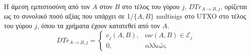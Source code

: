 {}
\begin{definition}
  Η άμεση εμπιστοσύνη από τον $A$ στον $B$ στο τέλος του γύρου $j$, $DTr_{A \rightarrow B, j}$, ορίζεται ως το συνολικό ποσό
  αξίας που υπάρχει σε 1/$\{A,B\}$ \textlatin{multisigs} στο \textlatin{UTXO} στο τέλος του γύρου $j$, όπου τα χρήματα έχουν
  κατατεθεί από τον $A$.
  \begin{equation}
    DTr_{A \rightarrow B, j} =
      \begin{cases}
        c_j\left(A, B\right), & \mbox{αν} \left(A, B\right) \in \mathcal{E}_j \\
        0, & \mbox{αλλιώς}
      \end{cases}
  \end{equation}
\end{definition}
